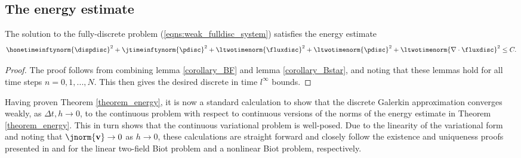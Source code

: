 \subsection{The energy estimate}
\label{sec:energy_estimate}

\begin{theorem}
\label{theorem_energy}
The solution to the fully-discrete problem (\ref{eqns:weak_fulldisc_system}) satisfies the energy estimate
\begin{equation*}
  \honetimeinftynorm{\dispdisc}^{2}+ \jtimeinftynorm{\pdisc}^{2}+ \ltwotimenorm{\fluxdisc}^{2} +\ltwotimenorm{\pdisc}^{2} +\ltwotimenorm{\nabla \cdot \fluxdisc}^{2} \leq C.
\end{equation*}
\end{theorem}
\begin{proof}
The proof follows from combining lemma \ref{corollary_BF} and lemma \ref{corollary_Bstar}, and noting that these lemmas hold for all time steps $n=0, 1,..., N$. This then gives the desired discrete in time $l^{\infty}$ bounds.
\end{proof}
\begin{rem}
\label{remark:wellposedness}
Having proven Theorem \ref{theorem_energy}, it is now a standard calculation to show that the discrete Galerkin approximation converges weakly, as $\Delta t, h \rightarrow 0$, to the continuous problem with respect to continuous versions of the norms of the energy estimate in Theorem \ref{theorem_energy}. This in turn shows that the continuous variational problem is well-posed. Due to the linearity of the variational form and noting that $\jnorm{\mathbf{v}} \rightarrow  0$ as $h \rightarrow 0$, these calculations are straight forward and closely follow the existence and uniqueness proofs presented in \cite{vzenivsek1984existence} and \cite{barucq2005some} for the linear two-field Biot problem and a nonlinear Biot problem, respectively.
\end{rem}
